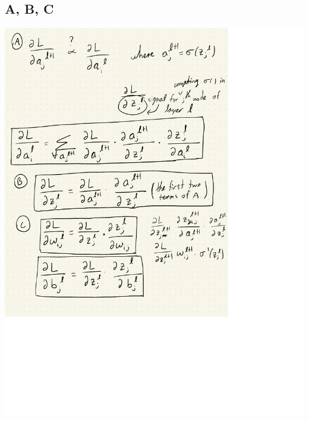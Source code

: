 \documentclass{article}
\begin{document}
\subsection{A, B, C}
\includegraphics*[width=16cm]{../figs/Q2_a_b_c.pdf}
\end{document}
